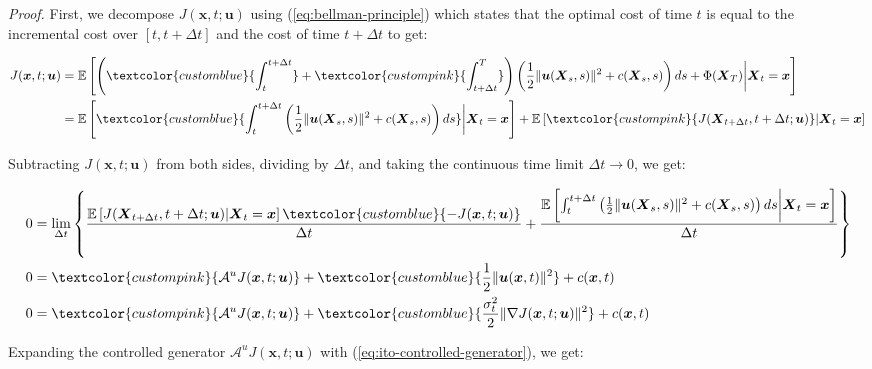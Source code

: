 \documentclass{article}
\newcommand{\bluetext}[1]{\textcolor{customblue}{#1}}
\newcommand{\pinktext}[1]{\textcolor{custompink}{#1}}
\begin{document}
\textit{Proof.} First, we decompose $J(\boldsymbol{x},t;\boldsymbol{u})$ using (\ref{eq:bellman-principle}) which states that the optimal cost of time $t$ is equal to the incremental cost over $[t, t+\Delta t]$ and the cost of time $t+\Delta t$ to get:
\begin{small}
\begin{align}
    J(\boldsymbol{x},t;\boldsymbol{u})&=\mathbb{E}\left[\left(\bluetext{\int_t^{t+\Delta t}}+\pinktext{\int_{t+\Delta t}^T}\right)\left(\frac{1}{2}\|\boldsymbol{u}(\boldsymbol{X}_s,s)\|^2+c(\boldsymbol{X}_s,s)\right)ds+\Phi(\boldsymbol{X}_T)\bigg|\boldsymbol{X}_t=\boldsymbol{x}\right]\nonumber\\
    &=\mathbb{E}\left[\bluetext{\int_t^{t+\Delta t}\left(\frac{1}{2}\|\boldsymbol{u}(\boldsymbol{X}_s,s)\|^2+c(\boldsymbol{X}_s,s)\right)ds}\bigg|\boldsymbol{X}_t=\boldsymbol{x}\right]+\mathbb{E}\left[\pinktext{J(\boldsymbol{X}_{t+\Delta t}, t+\Delta t; \boldsymbol{u})}|\boldsymbol{X}_t=\boldsymbol{x}\right]
\end{align}
\end{small}
Subtracting $J(\boldsymbol{x},t;\boldsymbol{u})$ from both sides, dividing by $\Delta t$, and taking the continuous time limit $\Delta t\to 0$, we get: 
\begin{small}
\begin{align}
    0&=\lim_{\Delta t}\left\{\frac{\mathbb{E}\left[J(\boldsymbol{X}_{t+\Delta t}, t+\Delta t; \boldsymbol{u})|\boldsymbol{X}_t=\boldsymbol{x}\right]\bluetext{-J(\boldsymbol{x},t;\boldsymbol{u})}}{\Delta t}+\frac{\mathbb{E}\left[\int_t^{t+\Delta t}\left(\frac{1}{2}\|\boldsymbol{u}(\boldsymbol{X}_s,s)\|^2+c(\boldsymbol{X}_s,s)\right)ds\bigg|\boldsymbol{X}_t=\boldsymbol{x}\right]}{\Delta t}\right\}\nonumber\\
    0&=\pinktext{\mathcal{A}^uJ(\boldsymbol{x},t; \boldsymbol{u})}+\bluetext{\frac{1}{2}\|\boldsymbol{u}(\boldsymbol{x},t)\|^2}+c(\boldsymbol{x},t)\nonumber\\
    0&=\pinktext{\mathcal{A}^uJ(\boldsymbol{x},t; \boldsymbol{u})}+\bluetext{\frac{\sigma^2_t}{2}\|\nabla J(\boldsymbol{x},t;\boldsymbol{u})\|^2}+c(\boldsymbol{x},t)\label{eq:basic-am-proof3}
\end{align}
\end{small}
Expanding the controlled generator $\mathcal{A}^uJ(\boldsymbol{x},t; \boldsymbol{u})$ with (\ref{eq:ito-controlled-generator}), we get: 
\end{document}
